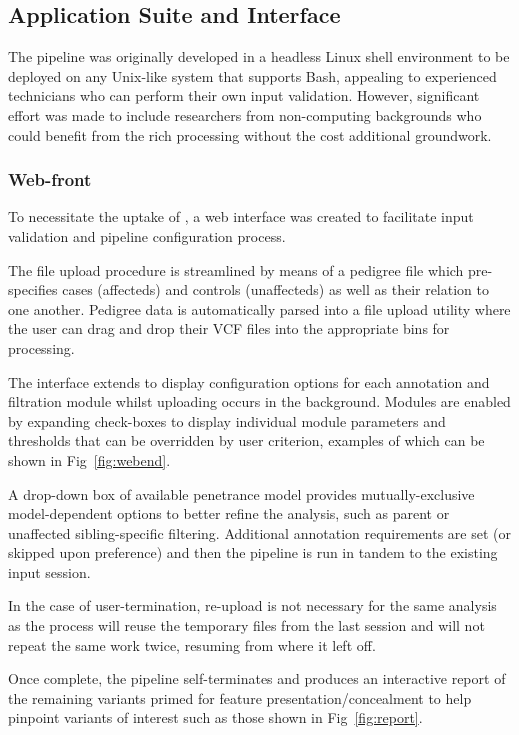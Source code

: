  
\subsection{Application Suite and Interface}

The pipeline was originally developed in a headless Linux shell environment to be deployed on any Unix-like system that supports Bash, appealing to experienced technicians who can perform their own input validation. However, significant effort was made to include researchers from non-computing backgrounds who could benefit from the rich processing without the cost additional groundwork.


\subsubsection{Web-front}

To necessitate the uptake of \app, a web interface was created to facilitate input validation and pipeline configuration process.

The file upload procedure is streamlined by means of a pedigree file which pre-specifies cases (affecteds) and controls (unaffecteds) as well as their relation to one another. Pedigree data is automatically parsed into a file upload utility where the user can drag and drop their VCF files into the appropriate bins for processing.

The interface extends to display configuration options for each annotation and filtration module whilst uploading occurs in the background. Modules are enabled by expanding check-boxes to display individual module parameters and thresholds that can be overridden by user criterion, examples of which can be shown in Fig~\ref{fig:webend}. 

A drop-down box of available penetrance model provides mutually-exclusive model-dependent options to better refine the analysis, such as parent or unaffected sibling-specific filtering. Additional annotation requirements are set (or skipped upon preference) and then the pipeline is run in tandem to the existing input session.

In the case of user-termination, re-upload is not necessary for the same analysis as the process will reuse the temporary files from the last session and will not repeat the same work twice, resuming from where it left off.

Once complete, the pipeline self-terminates and produces an interactive report of the remaining variants primed for feature presentation/concealment to help pinpoint variants of interest such as those shown in Fig~\ref{fig:report}.

